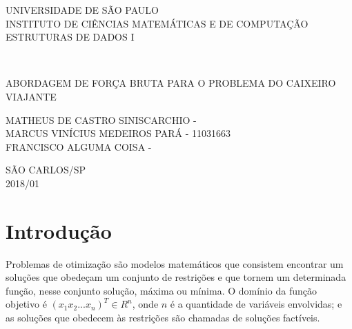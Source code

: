 \documentclass[a4paper, 12pt]{article} %
\date{2018}
\begin{document}
	\begin{titlepage}
\flushleft
	
		\begin{minipage}{1\linewidth}
	\centering
	
			UNIVERSIDADE DE SÃO PAULO\\
			INSTITUTO DE CIÊNCIAS  MATEMÁTICAS E DE COMPUTAÇÃO\\
			ESTRUTURAS DE DADOS I\\
			\end{minipage}
			\\[6.7 cm]
			\begin{center}
			ABORDAGEM DE FORÇA BRUTA PARA O PROBLEMA DO CAIXEIRO VIAJANTE\\[5 cm]
			\end{center}
			\begin{flushleft}
				
				MATHEUS DE CASTRO SINISCARCHIO - \\
				MARCUS VINÍCIUS MEDEIROS PARÁ - 11031663\\
				FRANCISCO ALGUMA COISA - \\ \vspace{\fill}
			\end{flushleft}
		\begin{center}
			SÃO CARLOS/SP\\2018/01
		\end{center}
		

	\end{titlepage}
	\renewcommand{\contentsname}{\normalsize{SUMÁRIO}}
	\tableofcontents
	
	\newpage
	
	\section{Introdução}
	
	
	Problemas de otimização são modelos matemáticos que consistem encontrar um soluções que obedeçam um conjunto de restrições e que tornem um determinada função, nesse conjunto solução, máxima ou mínima. O domínio da função objetivo é $( x_1 x_2 ... x_n)^T \in R^n$, onde $n$ é a quantidade de variáveis envolvidas; e as soluções que obedecem às restrições são chamadas de soluções factíveis.
	
\end{document}
